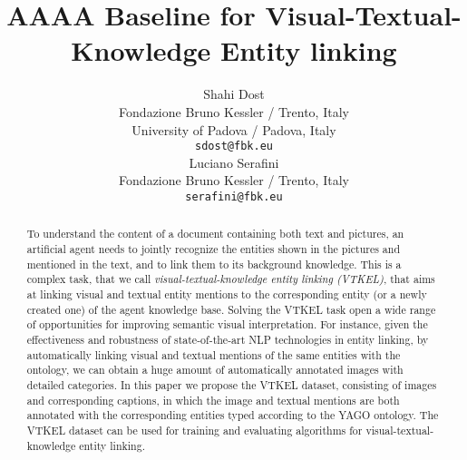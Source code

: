 \documentclass[11pt,a4paper]{article}
\title{AAAA Baseline for Visual-Textual-Knowledge Entity linking}
\author{Shahi Dost \\
  Fondazione Bruno Kessler / Trento, Italy \\
  University of Padova / Padova, Italy \\
  {\tt sdost@fbk.eu} \\\And
  Luciano Serafini \\
  Fondazione Bruno Kessler / Trento, Italy \\
  {\tt serafini@fbk.eu} \\}
\date{}
\begin{document}
\maketitle
\begin{abstract}
  To understand the content of a document containing both text and
pictures, an artificial agent needs to jointly recognize the
entities shown in the pictures and mentioned in the text, and to link
them to its background knowledge.  This is a complex task, that we
call \emph{visual-textual-knowledge entity linking (VTKEL)}, that
aims at linking visual and textual entity mentions to the
corresponding entity (or a newly created one) of the agent knowledge
base.  Solving the VTKEL task open a wide range of
opportunities for improving semantic visual interpretation. For
instance, given the effectiveness and robustness of state-of-the-art
NLP technologies in entity linking, by automatically linking visual and
textual mentions of the same entities with the ontology, we can obtain
a huge amount of automatically annotated images with detailed categories.
In this paper we propose the  VTKEL dataset, consisting of images and corresponding 
captions, in which the image and textual mentions are both annotated with the 
corresponding entities typed according to the YAGO ontology.  The VTKEL
dataset can be used for training and evaluating algorithms for
visual-textual-knowledge entity linking.

  
\end{abstract}
\end{document}
